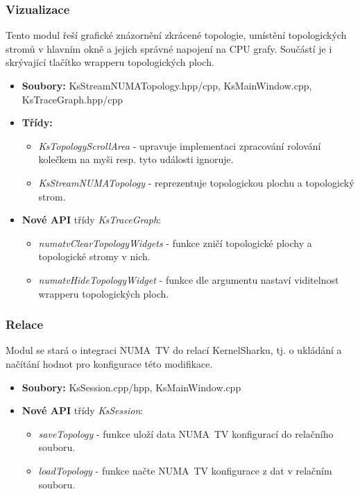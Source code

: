 \subsubsection*{Vizualizace}
Tento modul řeší grafické znázornění zkrácené topologie, umístění topologických stromů v hlavním okně a jejich správné napojení na CPU grafy. Součástí je i skrývající tlačítko wrapperu topologických ploch.

\begin{itemize}
    \item \textbf{Soubory:} KsStreamNUMATopology.hpp/cpp, KsMainWindow.cpp, KsTraceGraph.hpp/cpp
    \item \textbf{Třídy:}
    \begin{itemize}
        \item \emph{KsTopologyScrollArea} - upravuje implementaci zpracování rolování kolečkem na myši resp. tyto události ignoruje.
        \item \emph{KsStreamNUMATopology} - reprezentuje topologickou plochu a topologický strom.
    \end{itemize}
    \item \textbf{Nové API} třídy \emph{KsTraceGraph}:
    \begin{itemize}
        \item \emph{numatvClearTopologyWidgets} - funkce zničí topologické plochy a topologické stromy v nich.
        \item \emph{numatvHideTopologyWidget} - funkce dle argumentu nastaví viditelnost wrapperu topologických ploch.
    \end{itemize}
\end{itemize}

\subsubsection*{Relace}
Modul se stará o integraci NUMA~TV do relací KernelSharku, tj. o ukládání a načítání hodnot pro konfigurace této modifikace.

\begin{itemize}
    \item \textbf{Soubory:} KsSession.cpp/hpp, KsMainWindow.cpp
    \item \textbf{Nové API} třídy \emph{KsSession}:
    \begin{itemize}
        \item \emph{saveTopology} - funkce uloží data NUMA~TV konfigurací do relačního souboru.
        \item \emph{loadTopology} - funkce načte NUMA~TV konfigurace z dat v relačním souboru.
    \end{itemize}
\end{itemize}

